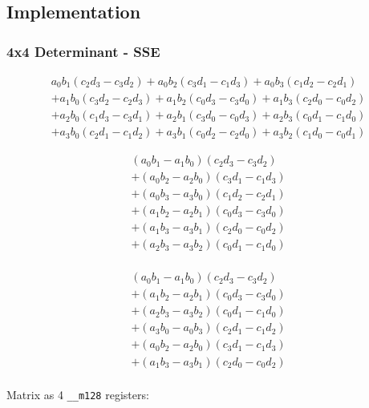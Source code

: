 \documentclass[]{scrartcl}
\newcommand{\pth}[1]{\left(#1\right)}
\begin{document}
\subsection{Implementation}

\subsubsection{4x4 Determinant - SSE}
\label{sec:determinant4x4SSE}

\begin{align*}
  a_0b_1 \pth{c_2d_3 - c_3d_2} 
+ a_0b_2 \pth{c_3d_1 - c_1d_3}
+ a_0b_3 \pth{c_1d_2 - c_2d_1}\\
+ a_1b_0 \pth{c_3d_2 - c_2d_3}
+ a_1b_2 \pth{c_0d_3 - c_3d_0}
+ a_1b_3 \pth{c_2d_0 - c_0d_2}\\
+ a_2b_0 \pth{c_1d_3 - c_3d_1}
+ a_2b_1 \pth{c_3d_0 - c_0d_3}
+ a_2b_3 \pth{c_0d_1 - c_1d_0}\\
+ a_3b_0 \pth{c_2d_1 - c_1d_2}
+ a_3b_1 \pth{c_0d_2 - c_2d_0}
+ a_3b_2 \pth{c_1d_0 - c_0d_1}
\end{align*}


\begin{align*}
  \pth{a_0b_1 - a_1b_0} \pth{c_2d_3 - c_3d_2}\\
+ \pth{a_0b_2 - a_2b_0} \pth{c_3d_1 - c_1d_3}\\
+ \pth{a_0b_3 - a_3b_0} \pth{c_1d_2 - c_2d_1}\\
+ \pth{a_1b_2 - a_2b_1} \pth{c_0d_3 - c_3d_0}\\
+ \pth{a_1b_3 - a_3b_1} \pth{c_2d_0 - c_0d_2}\\
+ \pth{a_2b_3 - a_3b_2} \pth{c_0d_1 - c_1d_0}\\
\end{align*}

\begin{align*}
  \pth{a_0b_1 - a_1b_0} \pth{c_2d_3 - c_3d_2}\\
+ \pth{a_1b_2 - a_2b_1} \pth{c_0d_3 - c_3d_0}\\
+ \pth{a_2b_3 - a_3b_2} \pth{c_0d_1 - c_1d_0}\\
+ \pth{a_3b_0 - a_0b_3} \pth{c_2d_1 - c_1d_2}\\
+ \pth{a_0b_2 - a_2b_0} \pth{c_3d_1 - c_1d_3}\\
+ \pth{a_1b_3 - a_3b_1} \pth{c_2d_0 - c_0d_2}\\
\end{align*}

Matrix as 4 \texttt{__m128} registers:
\end{document}
